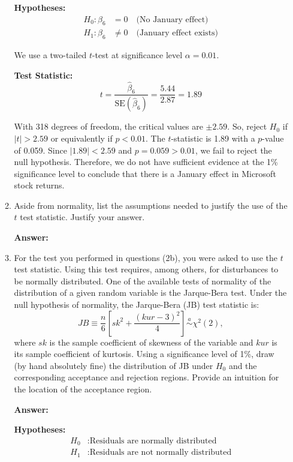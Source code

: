 \documentclass[12pt,a4paper]{article}
\begin{document}
\begin{enumerate}[label=(\roman*)]
\begin{enumerate}[label=(\alph*)]
  \textbf{Hypotheses:}
  \begin{align*}
      H_0: \beta_6 &= 0 \quad \text{(No January effect)} \\
      H_1: \beta_6 &\neq 0 \quad \text{(January effect exists)}
  \end{align*}

  We use a two-tailed $t$-test at significance level $\alpha = 0.01$.

    \textbf{Test Statistic:}
      \[
          t = \frac{\hat{\beta}_6}{\text{SE}(\hat{\beta}_6)} = \frac{5.44}{2.87} = 1.89
      \]

  With 318 degrees of freedom, the critical values are $\pm 2.59$. So, reject $H_0$ if $|t| > 2.59$ or equivalently if $p < 0.01$.
  The $t$-statistic is 1.89 with a $p$-value of 0.059. Since $|1.89| < 2.59$ and $p = 0.059 > 0.01$, we fail to reject the null hypothesis.
  Therefore, we do not have sufficient evidence at the 1\% significance level to conclude that there is a January effect in Microsoft stock returns.

  \item Aside from normality, list the assumptions needed to justify the use of the $t$ test statistic. Justify your answer.
  
  \textbf{Answer:} 
  
  \item For the test you performed in questions (2b), you were asked to use the $t$ test statistic. Using this test requires, among others, for disturbances to be normally distributed. One of the available tests of normality of the distribution of a given random variable is the Jarque-Bera test. Under the null hypothesis of normality, the Jarque-Bera (JB) test statistic is:
  \[
  JB \equiv \frac{n}{6}\left[sk^2 + \frac{(kur - 3)^2}{4}\right] \stackrel{a}{\sim} \chi^2(2),
  \]
  where $sk$ is the sample coefficient of skewness of the variable and $kur$ is its sample coefficient of kurtosis. Using a significance level of 1\%, draw (by hand absolutely fine) the distribution of JB under $H_0$ and the corresponding acceptance and rejection regions. Provide an intuition for the location of the acceptance region.
  
  \textbf{Answer:} 

  \textbf{Hypotheses:}
  \begin{align*}
    H_0&: \text{Residuals are normally distributed} \\
    H_1&: \text{Residuals are not normally distributed}
  \end{align*}


\end{enumerate}
\end{enumerate}
\end{document}
